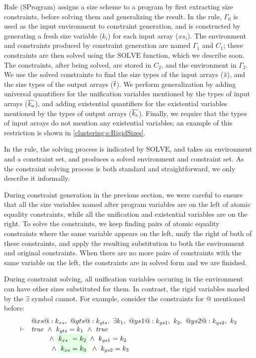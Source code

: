 Rule (SProgram) assigns a size scheme to a program by first extracting size constraints, before solving them and generalizing the result.
In the rule, $\Gamma_0$ is used as the input environment to constraint generation, and is constructed by generating a fresh size variable ($k_i$) for each input array ($xs_i$).
The environment and constraints produced by constraint generation are named $\Gamma_1$ and $C_1$; these constraints are then solved using the $\textrm{SOLVE}$ function, which we describe soon.
The constraints, after being solved, are stored in $C_2$, and the environment in $\Gamma_2$.
We use the solved constraints to find the size types of the input arrays ($\overline{s}$), and the size types of the output arrays ($\overline{t}$).
We perform generalization by adding universal quantifiers for the unification variables mentioned by the types of input arrays ($\overline{k_a}$), and adding existential quantifiers for the existential variables mentioned by the types of output arrays ($\overline{k_e}$).
Finally, we require that the types of input arrays do not mention any existential variables; an example of this restriction is shown in \cref{clustering:s:RigidSizes}.

In the rule, the solving process is indicated by $\textrm{SOLVE}$, and takes an environment and a constraint set, and produces a solved environment and constraint set.
As the constraint solving process is both standard and straightforward, we only describe it informally.

During constraint generation in the previous section, we were careful to ensure that all the size variables named after program variables are on the left of atomic equality constraints, while all the unification and existential variables are on the right.
To solve the constraints, we keep finding pairs of atomic equality constraints where the same variable appears on the left, unify the right of both of these constraints, and apply the resulting substitution to both the environment and original constraints.
When there are no more pairs of constraints with the same variable on the left, the constraints are in solved form and we are finished.

During constraint solving, all unification variables occuring in the environment can have other sizes substituted for them.
In contrast, the rigid variables marked by the $\exists$ symbol cannot.
For example, consider the constraints for @ mentioned before:
$$
\begin{array}{ll}
   & @xs @ : k_{xs},~
@gts@ : k_{gts},~ \exists k_1,~
@ys1@ : k_{ys1},~ k_2,~
@ys2@ : k_{ys2},~ k_3
\\
\vdash & \true 
        ~\wedge~  k_{gts} = k_1 ~\wedge~ \true
\\     &~~~~~~~\; 
          \wedge~  \colorbox{green!10}{$k_{xs}  ~= k_2$}
          \wedge~  k_{ys1}  = k_2 
\\     &~~~~~~~\; 
        ~ \wedge~  \colorbox{green!10}{$k_{xs}   = k_3$}
        ~ \wedge~  k_{ys2}  = k_3
\end{array}
$$

